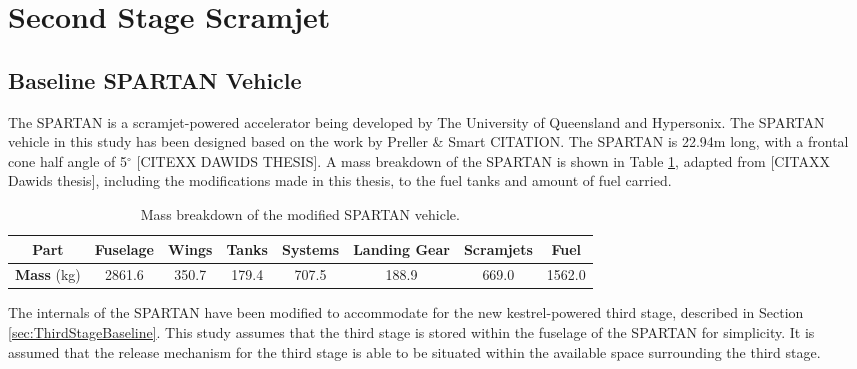 	
	
	\section{Second Stage Scramjet}

	
		\subsection{Baseline SPARTAN Vehicle}
		The SPARTAN is a scramjet-powered accelerator being developed by The University of Queensland and Hypersonix. 
		The SPARTAN vehicle in this study has been designed based on the work by Preller \& Smart CITATION. The SPARTAN is 22.94m long, with a frontal cone half angle of 5$^\circ$ [CITEXX DAWIDS THESIS]. A mass breakdown of the SPARTAN is shown in Table \ref{tab:MassBreakdown}, adapted from [CITAXX Dawids thesis], including the modifications made in this thesis, to the fuel tanks and amount of fuel carried.
		
		\begin{table}[h]
		\begin{tabular}{|c|c|c|c|c|c|c|c|}
			\hline  \textbf{Part} & Fuselage & Wings & Tanks & Systems & Landing Gear & Scramjets & Fuel \\ 
			\hline \textbf{Mass} (kg) & 2861.6 & 350.7 & 179.4 & 707.5 & 188.9 & 669.0 & 1562.0 \\ 
			\hline 
		\end{tabular} 
		\caption{Mass breakdown of the modified SPARTAN vehicle.}
		\label{tab:MassBreakdown}
		\end{table}
		
		

		The internals of the SPARTAN have been modified to accommodate for the new kestrel-powered third stage, described in Section \ref{sec:ThirdStageBaseline}. This study assumes that the third stage is stored within the fuselage of the SPARTAN for simplicity. It is assumed that the release mechanism for the third stage is able to be situated within the available space surrounding the third stage. 
		
		

